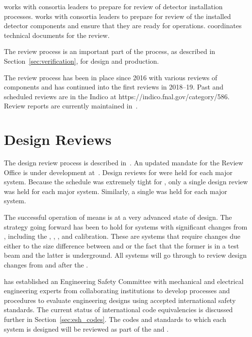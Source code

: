  works with consortia leaders to prepare for review of
detector installation processes.   works with consortia
leaders to prepare for review of the installed detector components and
ensure that they are ready for operations.   coordinates
technical documents for the   review.

The review process is an important part of the  
process, as described in Section~\ref{sec:verification}, for
design and production.

The review process has been in place since 2016 with various reviews
of  components and has continued into the first
 reviews in 2018--19. Past and scheduled reviews are in
the  Indico at https://indico.fnal.gov/category/586.
Review reports are currently maintained in~.

\section{Design Reviews}

The  design review process is described
in~. An updated mandate for the Review Office is under
development at~\cite{bib:cernedms2173197}. %
Design reviews
for  were held for each major system. Because the
schedule was extremely tight for , only a single
design review was held for each major system. Similarly, a single
 was held for each major system.

The successful operation of  means  is at
a very advanced state of design. The strategy going forward has been
to hold  for systems with significant changes from
, including the , ,
, and calibration. These are systems that require changes
due either to the size difference between  and 
or the fact that the former is in a test beam and the latter is underground. All
systems will go through  to review design changes from
 and  after the .

 has established an Engineering Safety Committee with
mechanical and electrical engineering experts from collaborating
institutions to develop processes and procedures to evaluate
engineering designs using accepted international safety standards. The
current status of international code equivalencies is discussed
further in Section~\ref{sec:esh_codes}. The codes and standards to
which each system is designed will be reviewed as part of the
 and .

